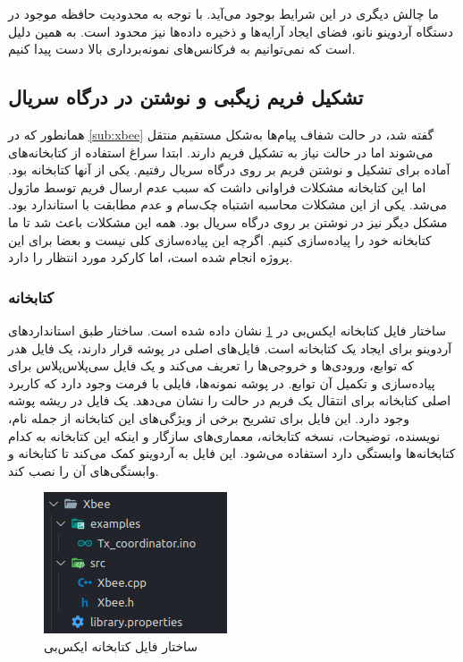 ما چالش دیگری در این شرایط بوجود می‌آید. با توجه به محدودیت حافظه موجود در دستگاه آردوینو نانو، فضای ایجاد آرایه‌ها و ذخیره داده‌ها نیز محدود است. به همین دلیل است که نمی‌توانیم به فرکانس‌های نمونه‌برداری بالا دست پیدا کنیم.

\subsection{تشکیل فریم زیگبی و نوشتن در درگاه سریال}

همانطور که در \cref{sub:xbee} گفته شد، در حالت شفاف پیام‌ها به‌شکل مستقیم منتقل می‌شوند اما در حالت  نیاز به تشکیل فریم دارند. ابتدا سراغ استفاده از کتابخانه‌های آماده برای تشکیل و نوشتن فریم بر روی درگاه سریال رفتیم. یکی از آنها کتابخانه  بود. اما این کتابخانه مشکلات فراوانی داشت که سبب عدم ارسال فریم توسط ماژول می‌شد. یکی از این مشکلات محاسبه اشتباه چک‌سام و عدم مطابقت با استاندارد بود. مشکل دیگر نیز در نوشتن بر روی درگاه سریال بود. همه این مشکلات باعث شد تا ما کتابخانه خود را پیاده‌سازی کنیم. اگرچه این پیاده‌سازی کلی نیست و بعضا برای این پروژه انجام شده است، اما کارکرد مورد انتظار را دارد.

\subsubsection{کتابخانه }

ساختار فایل کتابخانه ایکس‌بی در \cref{fig:xbee_lib} نشان داده شده است. ساختار طبق استانداردهای آردوینو برای ایجاد یک کتابخانه است. فایل‌های اصلی در پوشه  قرار دارند، یک فایل هدر که توابع، ورودی‌ها و خروجی‌ها را تعریف می‌کند و یک فایل سی‌پلاس‌پلاس برای پیاده‌سازی و تکمیل آن توابع. در پوشه نمونه‌ها، فایلی با فرمت  وجود دارد که کاربرد اصلی کتابخانه برای انتقال یک فریم در حالت  را نشان می‌دهد. یک فایل  در ریشه پوشه وجود دارد. این فایل برای تشریح برخی از ویژگی‌های این کتابخانه از جمله نام، نویسنده، توضیحات، نسخه کتابخانه، معماری‌های سازگار و اینکه این کتابخانه به کدام کتابخانه‌ها وابستگی دارد استفاده می‌شود. این فایل به  آردوینو کمک می‌کند تا کتابخانه و وابستگی‌های آن را نصب کند.

\begin{figure}[!h]
\centering\includegraphics[scale=1]{xbee_lib.png}
\caption{ساختار فایل کتابخانه ایکس‌بی}\label{fig:xbee_lib}
\end{figure}

